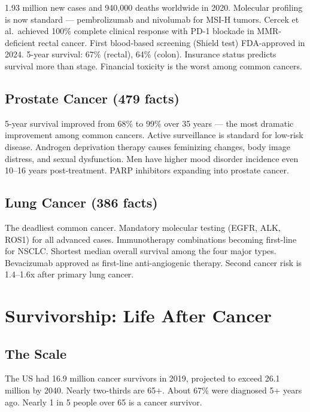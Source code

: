 1.93 million new cases and 940,000 deaths worldwide in 2020. Molecular
profiling is now standard --- pembrolizumab and nivolumab for MSI-H
tumors. Cercek et al.~achieved 100\% complete clinical response with
PD-1 blockade in MMR-deficient rectal cancer. First blood-based
screening (Shield test) FDA-approved in 2024. 5-year survival: 67\%
(rectal), 64\% (colon). Insurance status predicts survival more than
stage. Financial toxicity is the worst among common cancers.

\subsection{Prostate Cancer (479
facts)}\label{prostate-cancer-479-facts}

5-year survival improved from 68\% to 99\% over 35 years --- the most
dramatic improvement among common cancers. Active surveillance is
standard for low-risk disease. Androgen deprivation therapy causes
feminizing changes, body image distress, and sexual dysfunction. Men
have higher mood disorder incidence even 10--16 years post-treatment.
PARP inhibitors expanding into prostate cancer.

\subsection{Lung Cancer (386 facts)}\label{lung-cancer-386-facts}

The deadliest common cancer. Mandatory molecular testing (EGFR, ALK,
ROS1) for all advanced cases. Immunotherapy combinations becoming
first-line for NSCLC. Shortest median overall survival among the four
major types. Bevacizumab approved as first-line anti-angiogenic therapy.
Second cancer risk is 1.4--1.6x after primary lung cancer.

\newpage

\section{Survivorship: Life After
Cancer}\label{survivorship-life-after-cancer}

\subsection{The Scale}\label{the-scale}

The US had 16.9 million cancer survivors in 2019, projected to exceed
26.1 million by 2040. Nearly two-thirds are 65+. About 67\% were
diagnosed 5+ years ago. Nearly 1 in 5 people over 65 is a cancer
survivor.

